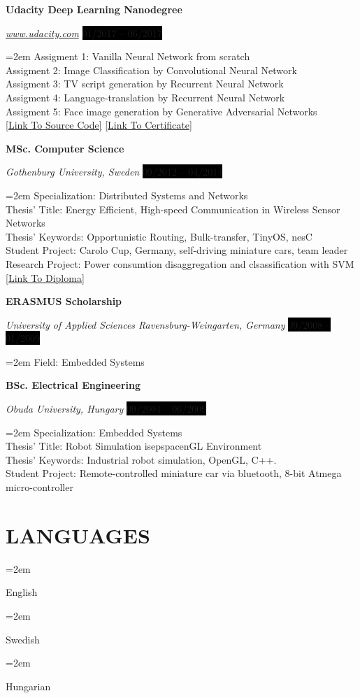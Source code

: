 \documentclass[paper=a4,fontsize=11pt]{scrartcl}	 			%
\newlength{\spacebox}
\newcommand{\NewPart}[1]{\section*{\uppercase{#1}}}
\newcommand{\PersonalEntry}[2]{
		\noindent\hangindent=2em\hangafter=0 		%
		\parbox{\spacebox}{						%
		\textit{#1}}								%
		\hspace{1.5em} #2 \par}					%
\newcommand{\SkillsEntry}[2]{						%
		\noindent\hangindent=2em\hangafter=0 		%
		\parbox{\spacebox}{						%
		\textit{#1}}								%
		\hspace{1.5em} #2 \par}					%
\newcommand{\EducationEntry}[4]{
		\noindent \textbf{#1} \par 					%
		\noindent \textit{#3} \hfill				%
		\colorbox{Black}{%
			\hfill\color{White}#2} \par				%
		\noindent\hangindent=2em\hangafter=0 \small #4 	%
		\normalsize \par
    }
\begin{document}
\EducationEntry{Udacity Deep Learning Nanodegree}{01/2017 -- 06/2017}
{\href{https://www.udacity.com}{www.udacity.com}} {Assigment 1: Vanilla Neural Network from scratch\\
 Assigment 2: Image Classification by Convolutional Neural Network\\
 Assigment 3: TV script generation by Recurrent Neural Network\\
 Assigment 4: Language-translation by Recurrent Neural Network\\
 Assigment 5: Face image generation by Generative Adversarial Networks \\
 \href{https://github.com/NagyAttila/Udacity_DLND_Assigments } {[Link To Source Code]}
 \href{https://github.com/NagyAttila/CV/blob/59391275197eb3badbd4f8f62faa413d1bc8eb0d/certificates/2017_Udacity_DLND.pdf} {[Link To Certificate]}
}

\EducationEntry{MSc. Computer Science}{09/2012 -- 04/2014}
  {Gothenburg University, Sweden}{Specialization: Distributed Systems and Networks\\
  Thesis' Title: Energy Efficient, High-speed Communication in Wireless Sensor Networks\\
  Thesis' Keywords: Opportunistic Routing, Bulk-transfer, TinyOS, nesC\\
  Student Project: Carolo Cup, Germany, self-driving miniature cars, team leader\\
  Research Project: Power consumtion disaggregation and clsassification with SVM \\
 \href{https://github.com/NagyAttila/CV/blob/59391275197eb3badbd4f8f62faa413d1bc8eb0d/certificates/2014_MSC.zip}
 {[Link To Diploma]}
}


\EducationEntry{ERASMUS Scholarship}{09/2008 -- 01/2009}
{University of Applied Sciences Ravensburg-Weingarten, Germany}
{Field: Embedded Systems }

\EducationEntry{BSc. Electrical Engineering}{09/2004 -- 06/2009}{Obuda University, Hungary}{Specialization: Embedded Systems\\
Thesis' Title: Robot Simulation isepspacenGL Environment\\
Thesis' Keywords: Industrial robot simulation, OpenGL, C++. \\
Student Project: Remote-controlled miniature car via bluetooth, 8-bit Atmega micro-controller}

\NewPart{Languages}{}
\SkillsEntry{ }{English}
\SkillsEntry{}{Swedish}
\SkillsEntry{}{Hungarian}
\end{document}
